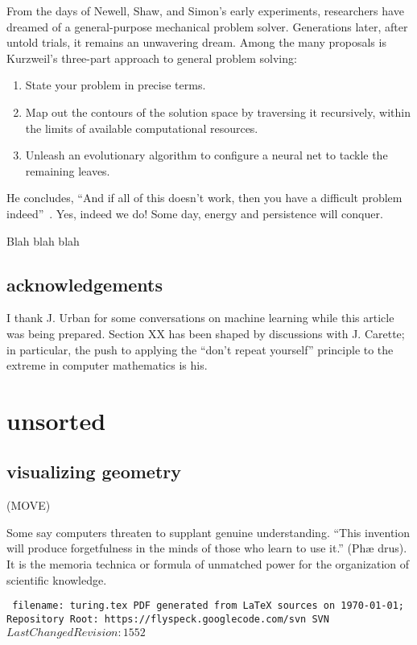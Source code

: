 \documentclass{llncs}
\def\svninfo{{\tt
  filename: turing.tex\hfill\break
  PDF generated from LaTeX sources on \today; \hfill\break
  Repository Root: https://flyspeck.googlecode.com/svn \hfill\break
  SVN $LastChangedRevision: 1552 $
  }
  }
\begin{document}
From the days of Newell, Shaw, and Simon's early experiments, researchers
have dreamed of a general-purpose mechanical problem solver.  Generations later,
after untold trials, it remains an unwavering dream.  Among the many
proposals is Kurzweil's three-part approach to general problem solving:
\begin{enumerate} 
\item State your problem in precise terms.
\item Map out the contours of the solution space by traversing it
  recursively, within the limits of available computational resources.
\item Unleash an evolutionary algorithm to configure a neural net to
  tackle the remaining leaves.
\end{enumerate}
He concludes, ``And if all of this doesn't work, then you have a
difficult problem indeed''~\cite{Ku99}.  Yes, indeed we do!  Some day,
energy and persistence will conquer.

\bigskip
Blah blah blah





\subsection{acknowledgements}

I thank J. Urban for some conversations on machine learning while this
article was being prepared. Section XX has been shaped by
discussions with J. Carette; in particular, the push to applying the
``don't repeat yourself'' principle to the extreme in computer mathematics is
his.


\section{unsorted}

\subsection{visualizing geometry}

(MOVE)

Some say computers threaten to supplant genuine
understanding.  ``This invention will produce
forgetfulness in the minds of those who learn to use it.'' (Ph\ae
drus).  
It is the memoria technica or formula of unmatched power for the
organization of scientific knowledge.



\raggedright



\bigskip
\noindent
\svninfo
\end{document}
